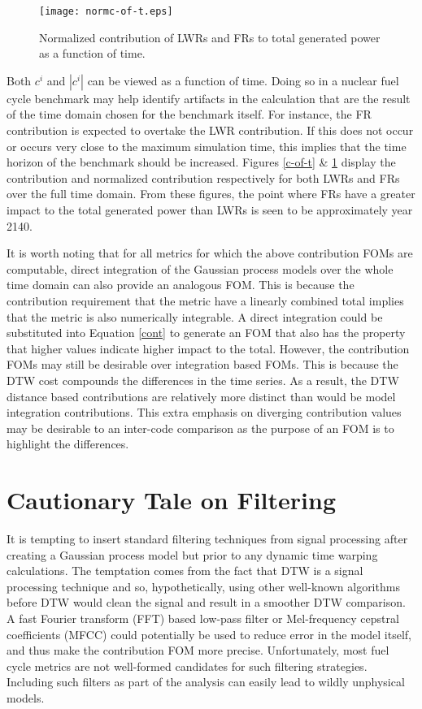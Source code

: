 \documentclass{ntmanuscript}
\begin{document}
\begin{figure}[htb]
\centering
\texttt{[image: normc-of-t.eps]}
\caption{Normalized contribution of LWRs and FRs to total generated power
as a function of time.}
\label{normc-of-t}
\end{figure}

Both $c^i$ and $|c^i|$ can be viewed as a function of time.
Doing so in a nuclear fuel cycle benchmark may help identify artifacts in the
calculation that are the result of the time domain chosen for the benchmark itself.
For instance, the FR contribution is expected to overtake the LWR contribution.
If this does not occur or occurs very close to the maximum simulation time,
this implies that the time horizon of the benchmark should be increased.
Figures \ref{c-of-t} \& \ref{normc-of-t} display the contribution and
normalized contribution respectively for both LWRs and FRs over the full
time domain. From these figures, the point where FRs have a greater impact
to the total generated power
than LWRs is seen to be approximately year 2140.

It is worth noting that for all metrics for which the above contribution FOMs
are computable, direct integration of the Gaussian process models over
the whole time domain can also provide an analogous FOM. This is because the
contribution requirement that the metric have a linearly combined total
implies that the metric is also numerically integrable. A direct integration
could be substituted into Equation \ref{cont} to generate an FOM that also
has the property that higher values indicate higher impact
to the total. However, the contribution FOMs may still be desirable over
integration based FOMs.  This is because the DTW cost compounds the
differences in the time series. As a result, the DTW distance based
contributions are relatively more distinct than would be model integration
contributions. This extra emphasis on diverging contribution values may be
desirable to an inter-code comparison as the purpose of an FOM is to
highlight the differences.

\clearpage
\section{Cautionary Tale on Filtering}
\label{filtering}

It is tempting to insert standard filtering techniques from signal processing
after creating a Gaussian process model but prior to any dynamic time warping
calculations. The temptation comes from the fact that DTW is a signal
processing technique and so, hypothetically, using other well-known algorithms
before DTW would clean the signal and result in a smoother DTW comparison.
A fast Fourier transform (FFT) based low-pass filter
\cite{merletti1999standards,moreland2003fft} or
Mel-frequency cepstral coefficients (MFCC) \cite{muda2010voice,imai1983cepstral}
could potentially be used to reduce error in the model itself,
and thus make the contribution FOM more precise. Unfortunately, most
fuel cycle metrics are not well-formed candidates for such filtering strategies.
Including such filters as part of the analysis can easily lead to wildly unphysical
models.
\end{document}
